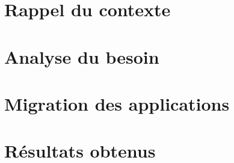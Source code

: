 \section{Rappel du contexte}
\section{Analyse du besoin}
\section{Migration des applications}
\section{Résultats obtenus}